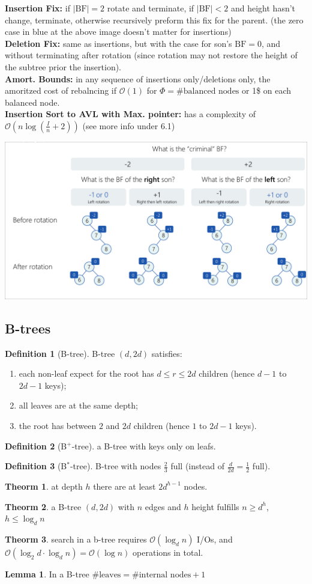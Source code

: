 \documentclass[]{article}
\newcommand\compactsubsection[1]        {\vspace{-10pt}\subsection{#1}\vspace{-6pt}}
\theoremstyle{definition}
\newtheorem{Theorem}{\color{theoColor}Theorm}
\newtheorem{Definition}{\color{defiColor}Definition}
\newtheorem{Lemma}{\color{lemColor}Lemma}
\newcommand\theo  [1] {\begin{Theorem}#1\end{Theorem}}
\newcommand\lem   [1] {\begin{Lemma}#1\end{Lemma}}
\newcommand\oc    {\mathcal{O}}
\newcommand\logn      {\log n}
\newcommand\sof[1]    {\left | #1 \right |}
\newcommand\cl [1]    {\left ( #1 \right )}
\begin{document}
\begin{multicols}{4}
				\textbf{Insertion Fix: }if $\sof{\mathrm{BF}} = 2$ rotate and terminate, if $|\mathrm{BF}| < 2$ and height hasn't change, terminate, otherwise recursively preform this fix for the parent. (the zero case in blue at the above image doesn't matter for insertions) \\
				\textbf{Deletion Fix: }same as insertions, but with the case for son's $\mathrm{BF}=0$, and without terminating after rotation (since rotation may not restore the height of the subtree prior the insertion). \\
				\textbf{Amort. Bounds: }in any sequence of insertions only/deletions only, the amoritzed cost of rebalncing if $\oc(1)$ for $\Phi = \# \text{balanced nodes}$ or 1\$ on each balanced node. \\
				\textbf{Insertion Sort to AVL with Max. pointer: }has a complexity of $\oc\cl{n \log\cl{\frac{I}{n} + 2}}$ (see more info under 6.1)
				\begin{center}
					\includegraphics[width=0.75\linewidth]{images/rotationTableDeletion}
				\end{center}
			
			\vspace{-5pt}
			\compactsubsection{B-trees}		
				\begin{Definition}[B-tree]
					B-tree $(d, 2d)$ satisfies: 
					\begin{enumerate}
						\item each non-leaf expect for the root has $d \le r \le 2d$ children (hence $d - 1$ to $2d - 1$ keys);
						\item all leaves are at the same depth;
						\item the root has between $2$ and $2d$ children (hence $1$ to $2d - 1$ keys). 
					\end{enumerate}
				\end{Definition}
				\begin{Definition}[B$^{\text{+}}$-tree]
					a B-tree with keys only on leafs. 
				\end{Definition}
				\begin{Definition}[B$^{\text{*}}$-tree]
					B-tree with nodes $\frac{2}{3}$ full (instead of $\frac{d}{2d} = \frac{1}{2}$ full). 
				\end{Definition}
				\theo{at depth $h$ there are at least $2d^{h - 1}$ nodes. }
				\theo{a B-tree $(d, 2d)$ with $n$ edges and $h$ height fulfills $n \ge d^{h}$, $h \le \log_{d} n$}
				\theo{search in a b-tree requires $\oc(\log_dn)$ I/Os, and $\oc(\log_2 d \cdot \log_d n) = \oc(\logn)$ operations in total. }
				\lem{In a B-tree $\# \text{leaves} = \# \text{internal nodes} + 1$}
				

\end{multicols}
\end{document}
